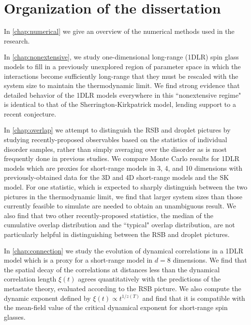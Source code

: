 \section{Organization of the dissertation}

  In \cref{chap:numerical} we give an overview of the numerical methods used in
  the research.

  In \cref{chap:nonextensive}, we study one-dimensional long-range (1DLR) spin
  glass models to fill in a previously unexplored region of parameter space in
  which the interactions become sufficiently long-range that they must be
  rescaled with the system size to maintain the thermodynamic limit. We find
  strong evidence that detailed behavior of the 1DLR models everywhere in this
  ``nonextensive regime" is identical to that of the Sherrington-Kirkpatrick
  model, lending support to a recent conjecture.

  In \cref{chap:overlap} we attempt to distinguish the RSB and droplet pictures
  by studying recently-proposed observables based on the statistics of
  individual disorder samples, rather than simply averaging over the disorder
  as is most frequently done in previous studies. We compare Monte Carlo
  results for 1DLR models which are proxies for short-range models in 3, 4, and
  10 dimensions with previously-obtained data for the 3D and 4D short-range
  models and the SK model. For one statistic, which is expected to sharply
  distinguish between the two pictures in the thermodynamic limit, we find that
  larger system sizes than those currently feasible to simulate are needed to
  obtain an unambiguous result. We also find that two other recently-proposed
  statistics, the median of the cumulative overlap distribution and the
  ``typical" overlap distribution, are not particularly helpful in
  distinguishing between the RSB and droplet pictures.

  In \cref{chap:connection} we study the evolution of dynamical correlations in
  a 1DLR model which is a proxy for a short-range model in $d=8$ dimensions. We
  find that the spatial decay of the correlations at distances less than the
  dynamical correlation length $\xi(t)$ agrees quantitatively with the
  predictions of the metastate theory, evaluated according to the RSB picture.
  We also compute the dynamic exponent defined by $\xi(t) \propto t^{1/z(T)}$
  and find that it is compatible with the mean-field value of the critical
  dynamical exponent for short-range spin glasses.

